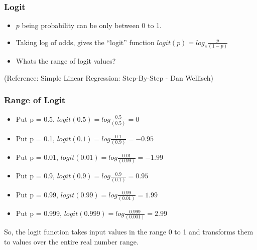 





\begin{frame}[fragile]\frametitle{Logit}
\begin{itemize}
\item $p$ being probability can be only between 0 to 1.%
\item Taking log of odds, gives the ``logit'' function $logit(p) = log_e \frac{p}{(1-p)}$
\item Whats the range of logit values?
\end{itemize}
\tiny{(Reference: Simple Linear Regression: Step-By-Step - Dan Wellisch)}
\end{frame}


\begin{frame}[fragile]\frametitle{Range of Logit}
 \begin{itemize}
\item Put p = 0.5, $logit(0.5) = log \frac{0.5}{(0.5)} = 0$
\item Put p = 0.1, $logit(0.1) = log \frac{0.1}{(0.9)} = -0.95$
\item Put p = 0.01, $logit(0.01) = log \frac{0.01}{(0.99)} = -1.99$
\item Put p = 0.9, $logit(0.9) = log \frac{0.9}{(0.1)} = 0.95$
\item Put p = 0.99, $logit(0.99) = log \frac{0.99}{(0.01)} = 1.99$
\item Put p = 0.999, $logit(0.999) = log \frac{0.999}{(0.001)} = 2.99$
\end{itemize}
So, the logit function takes input values in the range 0 to 1 and transforms them to 
values over the entire real number range.
\end{frame}

